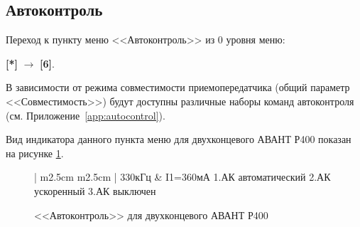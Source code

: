 \subsection{Автоконтроль}

Переход к пункту меню <<Автоконтроль>> из 0 уровня меню: 

\textbf{[*]} $\rightarrow$ \textbf{[6]}.

В зависимости от режима совместимости приемопередатчика (общий параметр <<Совместимость>>) будут доступны различные наборы команд автоконтроля (см. Приложение~\ref{app:autocontrol}). 


Вид индикатора данного пункта меню для двухконцевого АВАНТ Р400 показан на рисунке \ref{fig:autocontrol}.
 
\begin{figure}[H]
	\centering
	
	\begin{tabular}{| m{2.5cm}  m{2.5cm} |}
		\firsthline
		330кГц	& \raggedleft I1=360мА				\tabularnewline 
		 {1.АК автоматический}	\tabularnewline 
		 {2.АК ускоренный}		\tabularnewline 
		 {3.АК выключен}	 	\tabularnewline \hline
		\lasthline
	\end{tabular} 
	
	\caption{<<Автоконтроль>> для двухконцевого АВАНТ Р400}
	\label{fig:autocontrol}
\end{figure}